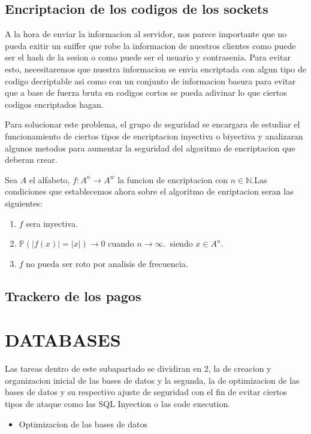 \documentclass{article}
\theoremstyle{definition}
\begin{document}
\subsection{Encriptacion de los codigos de los sockets}

A la hora de enviar la informacion al servidor, nos parece importante que no pueda exitir un sniffer que robe la informacion de nuestros clientes como puede ser el hash de la sesion o como puede ser el usuario y contrasenia. Para evitar esto, necesitaremos que nuestra informacion se envia encriptada con algun tipo de codigo decriptable asi como con un conjunto de informacion basura para evitar que a base de fuerza bruta en codigos cortos se pueda adivinar lo que ciertos codigos encriptados hagan.

Para solucionar este problema, el grupo de seguridad se encargara de estudiar el funcionamiento de ciertos tipos de encriptacion inyectiva o biyectiva y analizaran algunos metodos para aumentar la seguridad del algoritmo de encriptacion que deberan crear.

Sea $A$ el alfabeto, $f : A^n \to A^w$ la funcion de encriptacion con $n \in \mathbb{N}$.Las condiciones que establecemos ahora sobre el algoritmo de enriptacion seran las siguientes:

\begin{enumerate}
    \item $f$ sera inyectiva.
    \item $\mathbb{P}\left(|f(x)|=|x|\right) \to 0$ cuando $n \to \infty$.\, siendo $x \in A^n$.
    \item $f$ no pueda ser roto por analisis de frecuencia.
\end{enumerate}

\subsection{Trackero de los pagos}

\section{DATABASES}


Las tareas dentro de este subapartado se dividiran en 2, la de creacion y organizacion inicial de las bases de datos y la segunda, la de optimizacion de las bases de datos y su respectivo ajuste de seguridad con el fin de evitar ciertos tipos de ataque como las SQL Inyection o las code execution.


\begin{itemize}
    \item Optimizacion de las bases de datos
\end{itemize}
\end{document}
